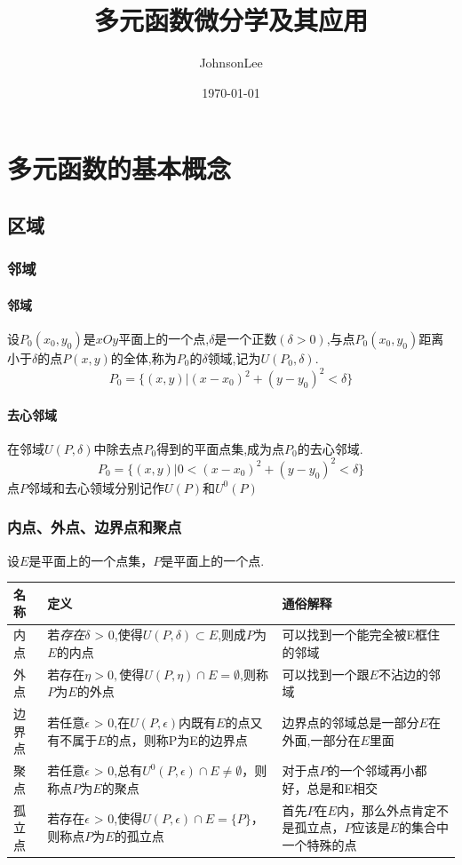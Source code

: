 \documentclass{ctexart}
\author{JohnsonLee}
\title{多元函数微分学及其应用}
\date{\today}
\begin{document}
  \begin{titlepage}
    \maketitle
    \tableofcontents
  \end{titlepage}
  \section{多元函数的基本概念}
    \subsection{区域}
      \subsubsection{邻域}
      \paragraph{邻域}
        设$P_0(x_0,y_0)$是$xOy$平面上的一个点,$\delta$是一个正数$(\delta > 0)$,与点$P_0(x_0,y_0)$距离小于$\delta$的点$P(x,y)$的全体,称为$P_0$的$\delta$领域,记为$U(P_0,\delta)$.
        $$P_0 = \{(x,y)|(x-x_0)^2 + (y-y_0)^2 < \delta\}$$
      \paragraph{去心邻域}
        在邻域$U(P,\delta)$中除去点$P_0$得到的平面点集,成为点$P_0$的去心邻域.
        $$P_0 = \{(x,y)|0<(x-x_0)^2 + (y-y_0)^2 < \delta\}$$
    点$P$邻域和去心领域分别记作$U(P)$和$U^0(P)$
      \subsubsection{内点、外点、边界点和聚点}
        设$E$是平面上的一个点集，$P$是平面上的一个点.
        \begin{table}[htbp]
          \centering
          \begin{tabularx}{\textwidth}{|l|X|X|}
            \hline
            名称&定义&通俗解释\\ \hline
            内点&若\emph{存在}$\delta$ > 0,使得$U(P,\delta) \subset E$,则成$P$为$E$的内点&可以找到一个能完全被E框住的邻域\\ \hline
            外点&若存在$\eta > 0,$使得$U(P,\eta) \cap E = \emptyset$,则称$P$为$E$的外点&可以找到一个跟$E$不沾边的邻域\\ \hline
            边界点&若任意$\epsilon$ > 0,在$U(P,\epsilon)$内既有$E$的点又有不属于$E$的点，则称P为E的边界点 & 边界点的邻域总是一部分$E$在外面,一部分在$E$里面\\ \hline
            聚点&若任意$\epsilon$ > 0,总有$U^0(P,\epsilon) \cap E \neq \emptyset$，则称点$P$为$E$的聚点&对于点$P$的一个邻域再小都好，总是和E相交\\ \hline
            孤立点&若存在$\epsilon$ > 0,使得$U(P,\epsilon) \cap E = \{P\}$，则称点$P$为$E$的孤立点&首先$P$在$E$内，那么外点肯定不是孤立点，$P$应该是$E$的集合中一个特殊的点\\ \hline
          \end{tabularx}
        \end{table}
\end{document}
